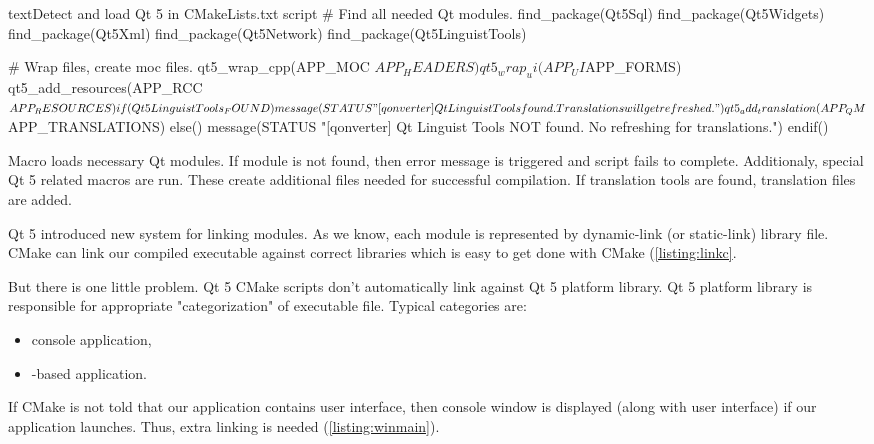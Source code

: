 \begin{fdoccode}{text}{}{Detect and load Qt 5 in CMakeLists.txt script}
# Find all needed Qt modules.
find_package(Qt5Sql)
find_package(Qt5Widgets)
find_package(Qt5Xml)
find_package(Qt5Network)
find_package(Qt5LinguistTools)

# Wrap files, create moc files.
qt5_wrap_cpp(APP_MOC ${APP_HEADERS})
qt5_wrap_ui(APP_UI ${APP_FORMS})
qt5_add_resources(APP_RCC ${APP_RESOURCES})

if(Qt5LinguistTools_FOUND)
    message(STATUS "[qonverter] Qt Linguist Tools found. Translations will get refreshed.")
    qt5_add_translation(APP_QM ${APP_TRANSLATIONS})
else()
    message(STATUS "[qonverter] Qt Linguist Tools NOT found. No refreshing for translations.")
endif()
\end{fdoccode}

Macro loads necessary Qt modules. If module is not found, then error message is triggered and script fails to complete. Additionaly, special Qt 5 related macros are run. These create additional files needed for successful compilation. If translation tools are found, translation files are added.

Qt 5 introduced new system for linking modules. As we know, each module is represented by dynamic-link (or static-link) library file. CMake can link our compiled executable against correct libraries which is easy to get done with CMake (\autoref{listing:linkc}.


But there is one little problem. Qt 5 CMake scripts don't automatically link against Qt 5 platform library. Qt 5 platform library is responsible for appropriate "categorization" of executable file. Typical categories are:
\begin{itemize}
\item console application,
\item {}-based application.
\end{itemize}

If CMake is not told that our application contains user interface, then console window is displayed (along with user interface) if our application launches. Thus, extra linking is needed (\autoref{listing:winmain}).


